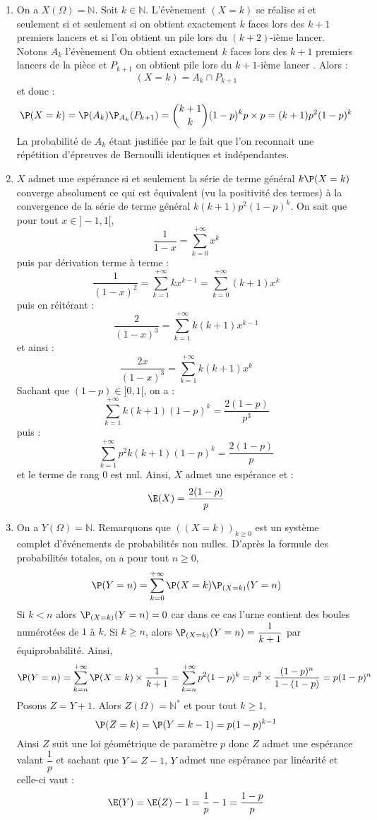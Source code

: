 \documentclass[a4paper,10pt]{report}
\begin{document}
\corr \begin{enumerate}
\item On a $X(\Omega) = \mathbb{N}$. Soit $k \in \mathbb{N}$. L'évènement $(X=k)$ se réalise si et seulement si et seulement si on obtient exactement $k$ faces lors des $k+1$ premiers lancers et si l'on obtient un pile lors du $(k+2)$-ième lancer. Notons $A_k$ l'évènement \og On obtient exactement $k$ faces lors des $k+1$ premiers lancers de la pièce \fg{} et $P_{k+1}$ \og on obtient pile lors du $k+1$-ième lancer \fg . Alors :
$$ (X=k) = A_k \cap P_{k+1}$$
et donc :
$$ \P(X=k) = \P(A_k) \P_{A_k}(P_{k+1}) = \binom{k+1}{k} (1-p)^k p \times p  = (k+1) p^2 (1-p)^k $$
La probabilité de $A_k$ étant justifiée par le fait que l'on reconnait une répétition d'épreuves de Bernoulli identiques et indépendantes.
\item $X$ admet une espérance si et seulement la série de terme général $k \P(X=k)$ converge absolument ce qui est équivalent (vu la positivité des termes) à la convergence de la série de terme général $k(k+1)p^2 (1-p)^k$.
On sait que pour tout $x \in ]-1,1[$,
$$ \dfrac{1}{1-x} = \sum_{k=0}^{+ \infty} x^k$$
puis par dérivation terme à terme :
$$ \dfrac{1}{(1-x)^2} = \sum_{k=1}^{+ \infty} k x^{k-1} = \sum_{k=0}^{+ \infty} (k+1)x^k$$
puis en réitérant :
$$ \dfrac{2}{(1-x)^3} = \sum_{k=1}^{+ \infty} k(k+1)x^{k-1}$$
et ainsi :
$$ \dfrac{2x}{(1-x)^3} = \sum_{k=1}^{+ \infty} k(k+1)x^{k}$$
Sachant que $(1-p) \in ]0,1[$, on a :
$$ \sum_{k=1}^{+ \infty} k(k+1)(1-p)^{k} = \dfrac{2(1-p)}{p^3}$$
puis :
$$ \sum_{k=1}^{+ \infty}p^2 k(k+1)(1-p)^{k} = \dfrac{2(1-p)}{p}$$
et le terme de rang $0$ est nul. Ainsi, $X$ admet une espérance et :
$$ \E(X) =  \dfrac{2(1-p)}{p}$$
\item On a $Y(\Omega)= \mathbb{N}$. Remarquons que $((X=k))_{k \geq 0}$ est un système complet d'événements de probabilités non nulles. D'après la formule des probabilités totales, on a pour tout $n \geq 0$,
$$ \P(Y=n) = \sum_{k=0}^{+ \infty} \P(X=k) \P_{(X=k)}(Y=n)$$
Si $k<n$ alors $\P_{(X=k)}(Y=n)=0$ car dans ce cas l'urne contient des boules numérotées de $1$ à $k$. Si $k \geq n$, alors $\P_{(X=k)}(Y=n) = \dfrac{1}{k+1}$ par équiprobabilité. Ainsi,
$$ \P(Y=n) = \sum_{k=n}^{+ \infty} \P(X=k) \times \dfrac{1}{k+1} =  \sum_{k=n}^{+ \infty} p^2 (1-p)^k = p^2 \times \dfrac{(1-p)^n}{1-(1-p)} = p (1-p)^n$$
Posons $Z=Y+1$. Alors $Z(\Omega)= \mathbb{N}^*$ et pour tout $k \geq 1$,
$$ \P(Z=k)= \P(Y=k-1) = p (1-p)^{k-1}$$
Ainsi $Z$ suit une loi géométrique de paramètre $p$ donc $Z$ admet une espérance valant $\dfrac{1}{p}$ et sachant que $Y = Z-1$, $Y$ admet une espérance par linéarité et celle-ci vaut :
$$ \E(Y) = \E(Z) - 1 = \dfrac{1}{p}-1 = \dfrac{1-p}{p}$$
\end{enumerate}   
\end{document}
